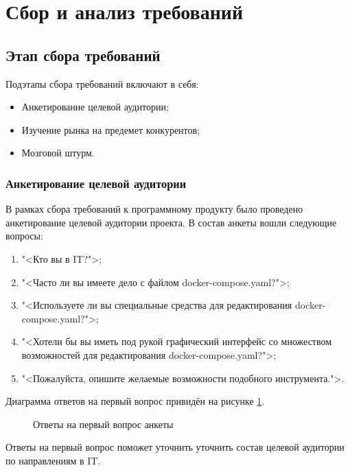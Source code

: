 \section{Сбор и анализ требований}
\subsection{Этап сбора требований}

\label{req:sect_1}

Подэтапы сбора требований включают в себя:

\begin{itemize}[wide]
    \item Анкетирование целевой аудитории;
    \item Изучение рынка на предемет конкурентов;
    \item Мозговой штурм.
\end{itemize}

\subsubsection{Анкетирование целевой аудитории}

В рамках сбора требований к программному продукту было проведено анкетирование целевой аудитории проекта. В состав анкеты вошли следующие вопросы:

\begin{enumerate}
    \item "<Кто вы в IT?">;
    \item "<Часто ли вы имеете дело с файлом docker-compose.yaml?">;
    \item "<Используете ли вы специальные средства для редактирования docker-compose.yaml?">;
    \item "<Хотели бы вы иметь под рукой графический интерфейс со множеством возможностей для редактирования docker-compose.yaml?">;
    \item "<Пожалуйста, опишите желаемые возможности подобного инструмента.">.
\end{enumerate}

Диаграмма ответов на первый вопрос привидён на рисунке \ref{req:first_q}.

\begin{figure}[H]
        \caption{Ответы на первый вопрос анкеты}
        \label{req:first_q}
\end{figure}

Ответы на первый вопрос поможет уточнить уточнить состав целевой аудитории по направлениям в IT.

